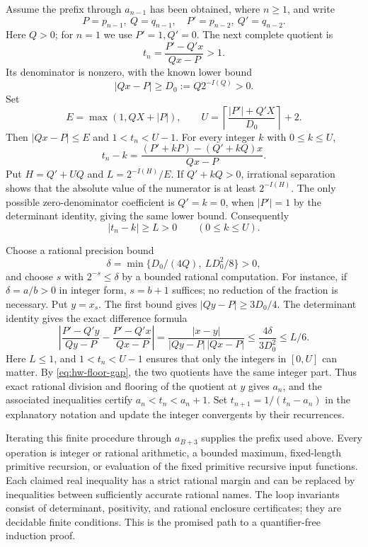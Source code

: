 Assume the prefix through \(a_{n-1}\) has been obtained, where \(n\ge1\),
and write
\[
 P=p_{n-1},\ Q=q_{n-1},\quad P'=p_{n-2},\ Q'=q_{n-2}.
\]
Here \(Q>0\); for \(n=1\) we use \(P'=1,Q'=0\).
The next complete quotient is
\begin{equation}\label{eq:hw-mobius}
 t_n=\frac{P'-Q'x}{Qx-P}>1.
\end{equation}
Its denominator is nonzero, with the known lower bound
\[
 |Qx-P|\ge D_0:=Q2^{-I(Q)}>0.
\]
Set
\[
 E=\max(1,QX+|P|),\qquad
 U=\left\lceil\frac{|P'|+Q'X}{D_0}\right\rceil+2.
\]
Then \(|Qx-P|\le E\) and \(1<t_n<U-1\).
For every integer \(k\) with \(0\le k\le U\),
\[
 t_n-k=\frac{(P'+kP)-(Q'+kQ)x}{Qx-P}.
\]
Put \(H=Q'+UQ\) and \(L=2^{-I(H)}/E\).
If \(Q'+kQ>0\), irrational separation shows that the absolute value
of the numerator is at least \(2^{-I(H)}\).
The only possible zero-denominator coefficient is \(Q'=k=0\), when
\(|P'|=1\) by the determinant identity, giving the same lower bound.
Consequently
\begin{equation}\label{eq:hw-floor-gap}
 |t_n-k|\ge L>0\qquad(0\le k\le U).
\end{equation}

Choose a rational precision bound
\[
 \delta=\min\{D_0/(4Q),\ LD_0^2/8\}>0,
\]
and choose \(s\) with \(2^{-s}\le\delta\) by a bounded rational computation.
For instance, if \(\delta=a/b>0\) in integer form, \(s=b+1\) suffices;
no reduction of the fraction is necessary.  Put \(y=x_s\).
The first bound gives \(|Qy-P|\ge3D_0/4\).  The determinant identity gives
the exact difference formula
\[
 \left|
 \frac{P'-Q'y}{Qy-P}-\frac{P'-Q'x}{Qx-P}
 \right|
 =\frac{|x-y|}{|Qy-P|\,|Qx-P|}
 \le\frac{4\delta}{3D_0^2}\le L/6.
\]
Here $L\le1$, and $1<t_n<U-1$ ensures that only the integers in
$[0,U]$ can matter.  By \eqref{eq:hw-floor-gap}, the two quotients have the same integer part.
Thus exact rational division and flooring of the quotient at \(y\) gives
\(a_n\), and the associated inequalities certify
\(a_n<t_n<a_n+1\).  Set \(t_{n+1}=1/(t_n-a_n)\) in the explanatory
notation and update the integer convergents by their recurrences.

Iterating this finite procedure through \(a_{B+3}\) supplies the prefix
used above.  Every operation is integer or rational arithmetic, a bounded
maximum, fixed-length primitive recursion, or evaluation of the fixed
primitive recursive input functions.  Each claimed real inequality has a
strict rational margin and can be replaced by inequalities between sufficiently
accurate rational names.  The loop invariants consist of determinant,
positivity, and rational enclosure certificates; they are decidable finite
conditions.  This is the promised path to a quantifier-free induction proof.

